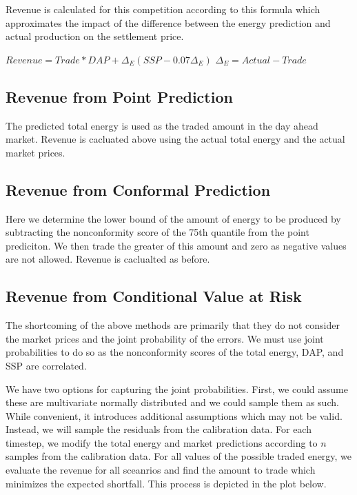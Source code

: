 \documentclass[
  journal,
]{IEEEtran}%
\begin{document}
Revenue is calculated for this competition according to this formula
which approximates the impact of the difference between the energy
prediction and actual production on the settlement price.

\(Revenue = Trade*DAP + \Delta_E (SSP - 0.07 \Delta_E)\)
\(\Delta_E = Actual - Trade\)

\subsection{Revenue from Point
Prediction}\label{revenue-from-point-prediction}

The predicted total energy is used as the traded amount in the day ahead
market. Revenue is cacluated above using the actual total energy and the
actual market prices.

\subsection{Revenue from Conformal
Prediction}\label{revenue-from-conformal-prediction}

Here we determine the lower bound of the amount of energy to be produced
by subtracting the nonconformity score of the 75th quantile from the
point prediciton. We then trade the greater of this amount and zero as
negative values are not allowed. Revenue is caclualted as before.

\subsection{Revenue from Conditional Value at
Risk}\label{revenue-from-conditional-value-at-risk}

The shortcoming of the above methods are primarily that they do not
consider the market prices and the joint probability of the errors. We
must use joint probabilities to do so as the nonconformity scores of the
total energy, DAP, and SSP are correlated.

We have two options for capturing the joint probabilities. First, we
could assume these are multivariate normally distributed and we could
sample them as such. While convenient, it introduces additional
assumptions which may not be valid. Instead, we will sample the
residuals from the calibration data. For each timestep, we modify the
total energy and market predictions according to \(n\) samples from the
calibration data. For all values of the possible traded energy, we
evaluate the revenue for all sceanrios and find the amount to trade
which minimizes the expected shortfall. This process is depicted in the
plot below.
\end{document}
